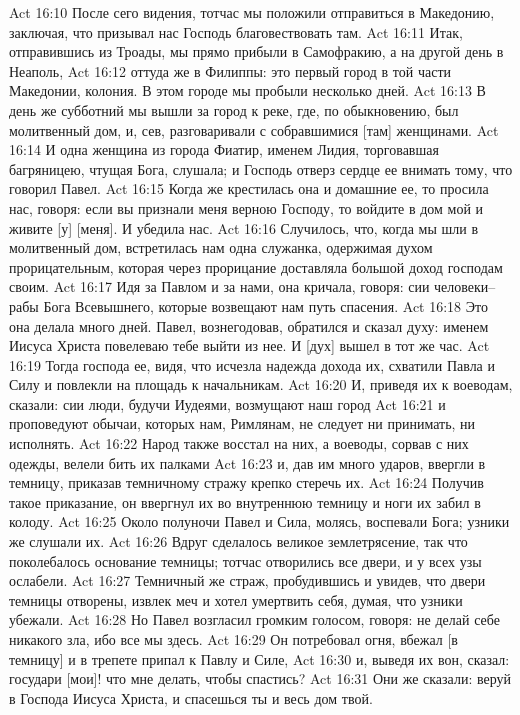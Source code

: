 Act 16:10  После сего видения, тотчас мы положили отправиться в Македонию, заключая, что призывал нас Господь благовествовать там.
Act 16:11  Итак, отправившись из Троады, мы прямо прибыли в Самофракию, а на другой день в Неаполь,
Act 16:12  оттуда же в Филиппы: это первый город в той части Македонии, колония. В этом городе мы пробыли несколько дней.
Act 16:13  В день же субботний мы вышли за город к реке, где, по обыкновению, был молитвенный дом, и, сев, разговаривали с собравшимися [там] женщинами.
Act 16:14  И одна женщина из города Фиатир, именем Лидия, торговавшая багряницею, чтущая Бога, слушала; и Господь отверз сердце ее внимать тому, что говорил Павел.
Act 16:15  Когда же крестилась она и домашние ее, то просила нас, говоря: если вы признали меня верною Господу, то войдите в дом мой и живите [у] [меня]. И убедила нас.
Act 16:16  Случилось, что, когда мы шли в молитвенный дом, встретилась нам одна служанка, одержимая духом прорицательным, которая через прорицание доставляла большой доход господам своим.
Act 16:17  Идя за Павлом и за нами, она кричала, говоря: сии человеки--рабы Бога Всевышнего, которые возвещают нам путь спасения.
Act 16:18  Это она делала много дней. Павел, вознегодовав, обратился и сказал духу: именем Иисуса Христа повелеваю тебе выйти из нее. И [дух] вышел в тот же час.
Act 16:19  Тогда господа ее, видя, что исчезла надежда дохода их, схватили Павла и Силу и повлекли на площадь к начальникам.
Act 16:20  И, приведя их к воеводам, сказали: сии люди, будучи Иудеями, возмущают наш город
Act 16:21  и проповедуют обычаи, которых нам, Римлянам, не следует ни принимать, ни исполнять.
Act 16:22  Народ также восстал на них, а воеводы, сорвав с них одежды, велели бить их палками
Act 16:23  и, дав им много ударов, ввергли в темницу, приказав темничному стражу крепко стеречь их.
Act 16:24  Получив такое приказание, он ввергнул их во внутреннюю темницу и ноги их забил в колоду.
Act 16:25  Около полуночи Павел и Сила, молясь, воспевали Бога; узники же слушали их.
Act 16:26  Вдруг сделалось великое землетрясение, так что поколебалось основание темницы; тотчас отворились все двери, и у всех узы ослабели.
Act 16:27  Темничный же страж, пробудившись и увидев, что двери темницы отворены, извлек меч и хотел умертвить себя, думая, что узники убежали.
Act 16:28  Но Павел возгласил громким голосом, говоря: не делай себе никакого зла, ибо все мы здесь.
Act 16:29  Он потребовал огня, вбежал [в темницу] и в трепете припал к Павлу и Силе,
Act 16:30  и, выведя их вон, сказал: государи [мои]! что мне делать, чтобы спастись?
Act 16:31  Они же сказали: веруй в Господа Иисуса Христа, и спасешься ты и весь дом твой.
